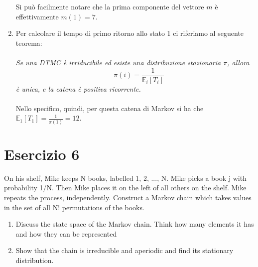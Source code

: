 \documentclass[
	12pt, %
]{fphw}
\begin{document}
\begin{enumerate}
\begin{matlaboutput}
		\end{matlaboutput}
	
	Si può facilmente notare che la prima componente del vettore $m$ è effettivamente $m(1) = 7$.\\
	\item Per calcolare il tempo di primo ritorno allo stato 1 ci riferiamo al seguente teorema:\\
	\\
	\null\quad \textit{Se una DTMC è irriducibile ed esiste una distribuzione stazionaria $\pi$, allora
	\begin{equation*}
		\quad\pi(i) = \frac{1}{\mathbb{E}_i [T_i]}
	\end{equation*}
	\null\quad è unica, e la catena è positiva ricorrente.}\\
	\\
	Nello specifico, quindi, per questa catena di Markov si ha che $\mathbb{E}_1 [T_1] = \frac{1}{\pi(1)} = 12$.
\end{enumerate}
\section*{Esercizio 6}

\begin{problem}
	\smallskip
	On his shelf, Mike keeps N books, labelled 1, 2, ..., N. Mike picks
	a book j with probability 1/N. Then Mike places it on the left of all
	others on the shelf. Mike repeats the process, independently. Construct
	a Markov chain which takes values in the set of all N! permutations of
	the books.
	\begin{enumerate}
		\item Discuss the state space of the Markov chain. Think how many
		elements it has and how they can be represented
		\item Show that the chain is irreducible and aperiodic and find its
		stationary distribution.		
	\end{enumerate}
	\smallskip
\end{problem}
	
\end{document}
